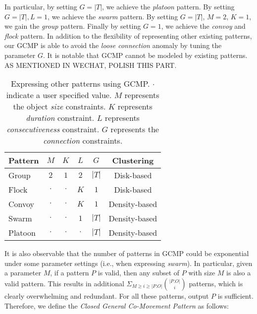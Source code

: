 In particular, by setting $G=|T|$, we achieve the \emph{platoon} pattern. By setting $G=|T|,L=1$, we achieve the \emph{swarm} pattern. By setting $G=|T|$, $M=2$, $K=1$, we gain the \emph{group} pattern. Finally by setting $G=1$, we achieve the \emph{convoy} and \emph{flock} pattern. 
In addition to the flexibility of representing other existing patterns, our GCMP is able to avoid the \emph{loose connection} anomaly by tuning the parameter $G$. 
%
It is notable that GCMP cannot be modeled by existing patterns. AS MENTIONED IN WECHAT, POLISH THIS PART.

\begin{table}
\centering
\begin{tabular}{|l|c|c|c|c|c|}
\hline 
Pattern & $M$ & $K$ & $L$ & $G$ & Clustering\\ 
\hline
Group & $2$ & $1$ & $2$ & $|T|$ & Disk-based\\
\hline
Flock & $\cdot$ & $\cdot$ & $K$ & $1$ & Disk-based \\
\hline 
Convoy & $\cdot$ & $\cdot$ & $K$ & $1$ & Density-based\\ 
\hline 
Swarm & $\cdot$ & $\cdot$ & $1$ & $|T|$ & Density-based \\ 
\hline 
Platoon & $\cdot$ & $\cdot$ & $\cdot$ & $|T|$ & Density-based\\ 
\hline 
\end{tabular} 
\caption{Expressing other patterns using GCMP. $\cdot$ indicate a user specified value. $M$ represents the 
object \emph{size} constraints. $K$ represents \emph{duration} constraint. $L$ represents \emph{consecutiveness} constraint. $G$ represents the \emph{connection} constraints.}
\label{tbl:patterns}
\end{table}
 
It is also observable that the number of patterns in GCMP could be exponential under some parameter settings (i.e., 
when expressing \emph{swarm}). In particular, given a parameter $M$, if a pattern $P$ is valid, then any subset of $P$ with 
size $M$ is also a valid pattern. This results in additional $\Sigma_{M\geq i \geq |P.O|} {|P.O| \choose i}$ patterns,
which is clearly overwhelming and redundant. For all these patterns, output $P$ is sufficient. Therefore, we define the \emph{Closed General Co-Movement Pattern} as follows:
%

